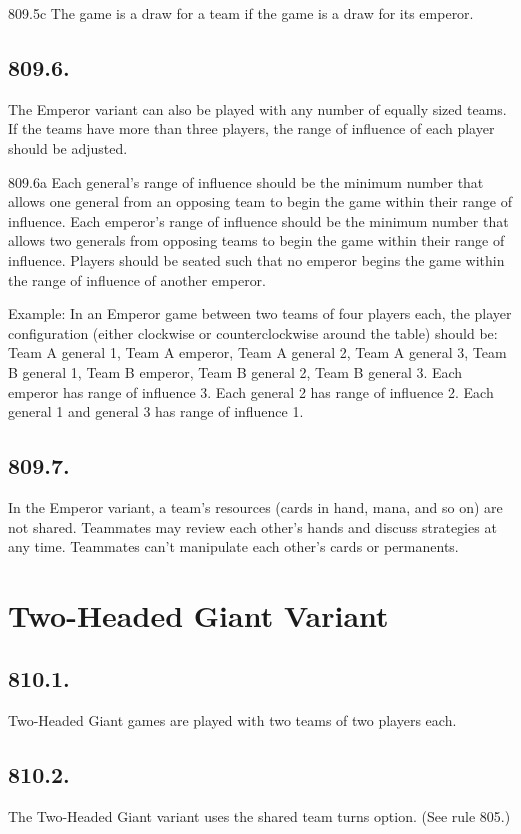 809.5c The game is a draw for a team if the game is a draw for its emperor.

\subsection*{809.6.}
The Emperor variant can also be played with any number of equally sized teams. If the teams have more than three players, the range of influence of each player should be adjusted.

809.6a Each general’s range of influence should be the minimum number that allows one general from an opposing team to begin the game within their range of influence. Each emperor’s range of influence should be the minimum number that allows two generals from opposing teams to begin the game within their range of influence. Players should be seated such that no emperor begins the game within the range of influence of another emperor.

Example: In an Emperor game between two teams of four players each, the player configuration (either clockwise or counterclockwise around the table) should be: Team A general 1, Team A emperor, Team A general 2, Team A general 3, Team B general 1, Team B emperor, Team B general 2, Team B general 3. Each emperor has range of influence 3. Each general 2 has range of influence 2. Each general 1 and general 3 has range of influence 1.

\subsection*{809.7.}
In the Emperor variant, a team’s resources (cards in hand, mana, and so on) are not shared. Teammates may review each other’s hands and discuss strategies at any time. Teammates can’t manipulate each other’s cards or permanents.

\section{Two-Headed Giant Variant}
\subsection*{810.1.}
Two-Headed Giant games are played with two teams of two players each.

\subsection*{810.2.}
The Two-Headed Giant variant uses the shared team turns option. (See rule 805.)

